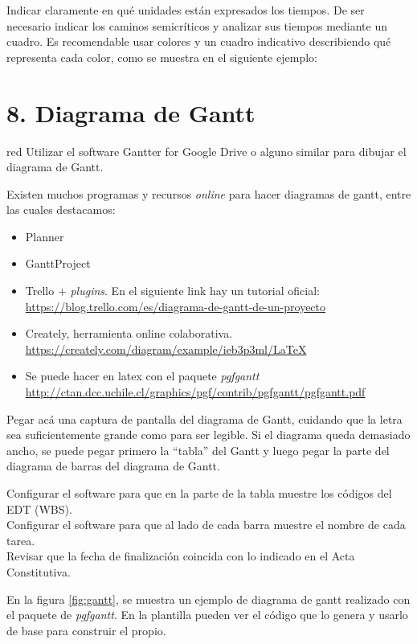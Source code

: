 \documentclass[11pt]{charter}
\begin{document}
Indicar claramente en qué unidades están expresados los tiempos.
De ser necesario indicar los caminos semicríticos y analizar sus tiempos mediante un cuadro.
Es recomendable usar colores y un cuadro indicativo describiendo qué representa cada color, como se muestra en el siguiente ejemplo:



\section{8. Diagrama de Gantt}
\label{sec:gantt}

\begin{consigna}{red}
Utilizar el software Gantter for Google Drive o alguno similar para dibujar el diagrama de Gantt.

Existen muchos programas y recursos \textit{online} para hacer diagramas de gantt, entre las cuales destacamos:

\begin{itemize}
\item Planner
\item GanttProject
\item Trello + \textit{plugins}. En el siguiente link hay un tutorial oficial: \\ \url{https://blog.trello.com/es/diagrama-de-gantt-de-un-proyecto}
\item Creately, herramienta online colaborativa. \\\url{https://creately.com/diagram/example/ieb3p3ml/LaTeX}
\item Se puede hacer en latex con el paquete \textit{pgfgantt}\\ \url{http://ctan.dcc.uchile.cl/graphics/pgf/contrib/pgfgantt/pgfgantt.pdf}
\end{itemize}

Pegar acá una captura de pantalla del diagrama de Gantt, cuidando que la letra sea suficientemente grande como para ser legible. 
Si el diagrama queda demasiado ancho, se puede pegar primero la ``tabla'' del Gantt y luego pegar la parte del diagrama de barras del diagrama de Gantt.

Configurar el software para que en la parte de la tabla muestre los códigos del EDT (WBS).\\
Configurar el software para que al lado de cada barra muestre el nombre de cada tarea.\\
Revisar que la fecha de finalización coincida con lo indicado en el Acta Constitutiva.

En la figura \ref{fig:gantt}, se muestra un ejemplo de diagrama de gantt realizado con el paquete de \textit{pgfgantt}. En la plantilla pueden ver el código que lo genera y usarlo de base para construir el propio.


\end{consigna}
\end{document}
